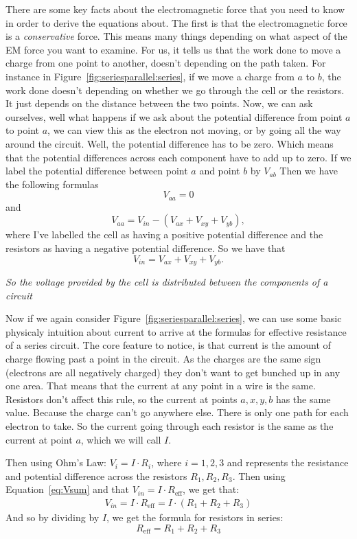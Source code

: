 \documentclass[12pt]{article}
\begin{document}
There are some key facts about the electromagnetic force that you need to know in order to derive the equations about. The first is that the electromagnetic force is a \emph{conservative} force. This means many things depending on what aspect of the EM force you want to examine. For us, it tells us that the work done to move a charge from one point to another, doesn't depending on the path taken. For instance in Figure~\ref{fig:seriesparallel:series}, if we move a charge from $a$ to $b$, the work done doesn't depending on whether we go through the cell or the resistors. It just depends on the distance between the two points. Now, we can ask ourselves, well what happens if we ask about the potential difference from point $a$ to point $a$, we can view this as the electron not moving, or by going all the way around the circuit. Well, the potential difference has to be zero. Which means that the potential differences across each component have to add up to zero.
If we label the potential difference between point $a$ and point $b$ by $V_{ab}$
Then we have the following formulas
$$V_{aa} = 0$$
and
$$V_{aa} =  V_{in} - (V_{ax} + V_{xy} + V_{yb}),$$
where I've labelled the cell as having a positive potential difference and the resistors as having a negative potential difference.
So we have that
\begin{equation}\label{eq:Vsum}V_{in} = V_{ax}+ V_{xy} + V_{yb}.\end{equation}

\emph{So the voltage provided by the cell is distributed between the components of a circuit}

Now if we again consider Figure~\ref{fig:seriesparallel:series}, we can use some basic physicaly intuition about current to arrive at the formulas for effective resistance of a series circuit. The core feature to notice, is that current is the amount of charge flowing past a point in the circuit. As the charges are the same sign (electrons are all negatively charged) they don't want to get bunched up in any one area. That means that the current at any point in a wire is the same. Resistors don't affect this rule, so the current at points $a,x,y,b$ has the same value. Because the charge can't go anywhere else. There is only one path for each electron to take.
So the current going through each resistor is the same as the current at point $a$, which we will call $I$.

Then using Ohm's Law: $V_i= I\cdot R_i$, where $i=1,2,3$ and represents the resistance and potential difference across the resistors $R_1, R_2, R_3$. Then using Equation~\ref{eq:Vsum} and that $V_{in} = I \cdot R_{\text{eff}}$, we get that:
\begin{align}
  V_{in} = I\cdot R_{\text{eff}} = I \cdot (R_1 + R_2 + R_3)
\end{align}
And so by dividing by $I$, we get the formula for resistors in series:
$$R_{\text{eff}} = R_1 + R_2 + R_3$$
\end{document}
